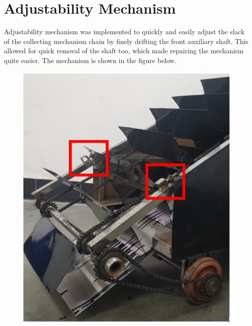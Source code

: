\section{Adjustability Mechanism}

    Adjustability mechanism was implemented to quickly and easily adjust the slack of the collecting mechanism chain by finely drifting the front auxiliary shaft. This allowed for quick removal of the shaft too, which made repairing the mechanism quite easier. The mechanism is shown in the figure below.
   
\begin{figure}[H]
  \centering
    \begin{minipage}{0.40\textwidth}
    \centering
      \includegraphics[width=1\textwidth]{adj ass.PNG}
    \end{minipage}
\hfill
    \begin{minipage}{0.50\textwidth}
    \centering

\end{minipage}
\end{figure}
